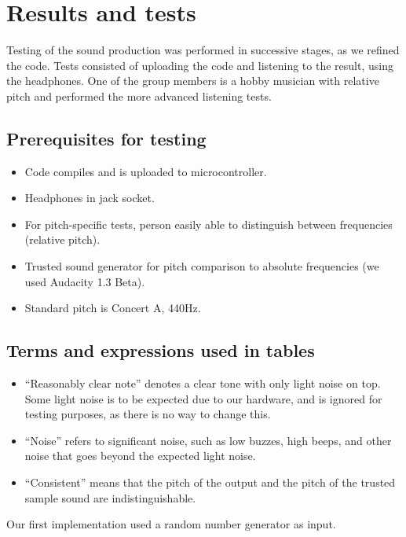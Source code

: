 \section{Results and tests}

Testing of the sound production was performed in successive stages, as
we refined the code. Tests consisted of uploading the code and listening
to the result, using the headphones. One of the group members is a hobby
musician with relative pitch and performed the more advanced listening
tests.

\subsection*{Prerequisites for testing}
\begin{itemize}
\item Code compiles and is uploaded to microcontroller.
\item Headphones in jack socket.
\item For pitch-specific tests, person easily able to distinguish between frequencies (relative pitch).
\item Trusted sound generator for pitch comparison to absolute frequencies (we used Audacity 1.3 Beta).
\item Standard pitch is Concert A, 440Hz.
\end{itemize}

\subsection*{Terms and expressions used in tables}
\begin{itemize}
\item ``Reasonably clear note'' denotes a clear tone with only light
noise on top. Some light noise is to be expected due to our hardware,
and is ignored for testing purposes, as there is no way to change this.
\item ``Noise'' refers to significant noise, such as low buzzes, high
beeps, and other noise that goes beyond the expected light noise.
\item ``Consistent'' means that the pitch of the output and the
pitch of the trusted sample sound are indistinguishable.
\end{itemize}

Our first implementation used a random number generator as input.
